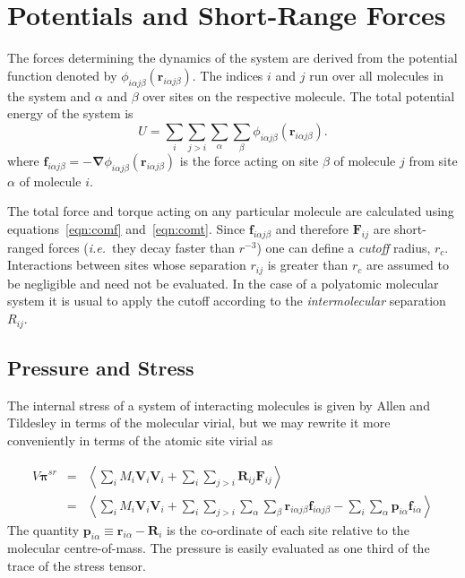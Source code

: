 \documentclass[a4paper,twoside]{report}
\providecommand{\bm}[1]{\mathbf{#1}}
\newcommand{\ie}{\emph{i.e.}}
\begin{document}
\section{Potentials and Short-Range Forces}%

The forces determining the dynamics of the system are derived from the
potential function denoted by $\phi_{i\alpha j\beta}(\bm{r} _{i\alpha
  j\beta})$.  The indices $i$ and $j$ run over all molecules in the
system and $\alpha$ and $\beta$ over sites on the respective molecule.
The total potential energy of the system is
\begin{equation}
\label{eqn:toten}
U = \sum_i \sum_{j > i} \sum_\alpha \sum_\beta \phi_{i\alpha j\beta}(
\bm{r}_{i\alpha j\beta}).
\end{equation}
where $\bm{f}_{i\alpha j\beta} = - \bm{\nabla} \phi_{i\alpha  j\beta}(
\bm{r}_{i\alpha j\beta})$ is the force acting on site $\beta$ of molecule
$j$ from site $\alpha$ of molecule $i$.

The total force and torque acting on any particular molecule are
calculated using equations~\ref{eqn:comf} and~\ref{eqn:comt}.  Since
$\bm{f}_{i\alpha j\beta}$ and therefore $\bm{F}_{ij}$ are short-ranged
forces (\ie\ they decay faster than $r^{-3}$) one can define a
\emph{cutoff} radius, $r_c$.  Interactions between sites whose
separation $r_{ij}$ is greater than $r_c$ are assumed to be negligible
and need not be evaluated.  In the case of a polyatomic molecular
system it is usual to apply the cutoff according to the
\emph{intermolecular} separation $R_{ij}$.


\subsection{Pressure and Stress}
The internal stress of a system of interacting molecules is given by
Allen and Tildesley\cite[pp 46-49]{allen:87} in terms of the molecular
virial, but we may rewrite it more conveniently in terms of the atomic
site virial as

\begin{eqnarray}
\label{eqn:stress-sr}
V \bm{\pi}^{sr} & = & \left <  \sum_i M_i \bm{V}_i \bm{V}_i 
              + \sum_i \sum_{j>i} \bm{R}_{ij} \bm{F}_{ij} 
\right > \\ \nonumber
& = & \left < \sum_i M_i \bm{V}_i \bm{V}_i 
              + \sum_{i} \sum_{j>i} \sum_\alpha \sum_\beta 
                \bm{r}_{i\alpha j\beta}  \bm{f}_{i\alpha j\beta} 
              - \sum_i \sum_\alpha \bm{p}_{i\alpha} \bm{f}_{i\alpha}
\right >
\end{eqnarray}
The quantity $\bm{p}_{i\alpha} \equiv \bm{r}_{i\alpha} - \bm{R}_i$ is the
co-ordinate of each site relative to the molecular centre-of-mass.
The pressure is easily evaluated as one third of the trace of the
stress tensor. 
\end{document}
